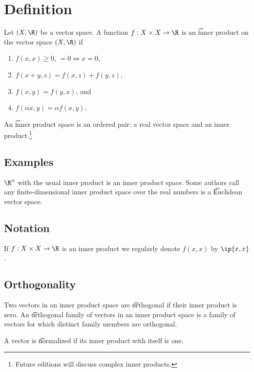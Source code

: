 

\section*{Definition}

Let $(X, \R )$ be a vector space.
A function $f: X \times  X \to \R $ is an \t{inner product} on the vector space $(X, \R )$ if
    \begin{enumerate}
      \item $f(x,x) \geq 0$, $= 0 \iff x = 0$,
      \item $f(x+y,z) = f(x,z) + f(y, z)$,
      \item $f(x,y) = f(y,x)$, and
      \item $f(\alpha  x,y) = \alpha  f(x,y)$.
    \end{enumerate}
An \t{inner product space} is an ordered pair: a real vector space and an inner product.\footnote{Future editions will discuss complex inner products.}

\subsection*{Examples}

$\R ^n$ with the usual inner product is an inner product space.
Some authors call any finite-dimensional inner product space over the real numbers is a \t{Euclidean vector space}.

\subsection*{Notation}

If $f: X \times  X \to \R $ is an inner product we regularly denote $f(x, x)$ by $\ip{x,x}$.

\subsection*{Orthogonality}

Two vectors in an inner product space are \t{orthogonal} if their inner product is zero.
An \t{orthogonal family of vectors} in an inner product space is a family of vectors for which distinct family members are orthogonal.

A vector is \t{normalized} if its inner product with itself is one.

\blankpage
